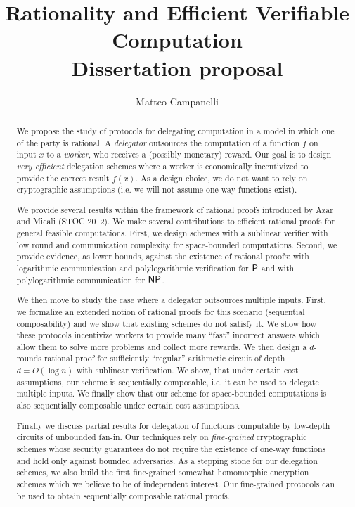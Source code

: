 \documentclass[nobib]{tufte-handout}
\title[Rationality and Efficient Verifiable Computation]{Rationality and Efficient Verifiable Computation\\ \noindent \small{Dissertation proposal}}
\author{Matteo Campanelli}
\date{}
\begin{document}
\maketitle

  
  \begin{abstract}
  	\noindent
  	We propose the study of protocols for delegating computation in a model in which one of the party is rational.
  	A \textit{delegator} outsources the computation of a function $f$ on input $x$ to a \textit{worker}, who
  	receives a (possibly monetary) reward. Our goal is to design \textit{very efficient} delegation schemes 
  	where a worker is economically incentivized to provide the correct result
  	$f(x)$. As a design choice, we do not want to rely on cryptographic assumptions
  	(i.e. we will not assume one-way functions exist).
  	
  	We provide several results within the framework of rational proofs introduced by Azar and Micali (STOC 2012).
  	We make several contributions to efficient rational proofs for general feasible computations.
  	First, we design schemes with a sublinear verifier with low round and communication complexity for
  	space-bounded computations.
  	Second, we provide evidence, as lower bounds, against the existence of rational proofs:
  	with logarithmic communication and polylogarithmic verification for $\P$ and 
  	with polylogarithmic communication for $\NP$.
  	
  	We then move to study the case where a delegator outsources multiple inputs.
  	First, we formalize an extended notion of rational proofs for this scenario (sequential composability) and we
  	show that existing schemes do not satisfy it. We show how these protocols incentivize workers
  	to provide many ``fast'' incorrect answers which allow them to solve more problems and collect more rewards.
  	We then design a $d$-rounds rational proof for sufficiently ``regular'' arithmetic circuit of depth $d = O(\log{n})$
  	with sublinear verification. We show, that under certain cost assumptions, our scheme is sequentially composable,
  	i.e. it can be used to delegate multiple inputs. We finally show that our scheme for space-bounded computations is also 
  	sequentially composable under certain cost assumptions.
  	
  	
	Finally we discuss partial results for delegation of functions computable by low-depth circuits of unbounded fan-in.
	Our techniques rely on \textit{fine-grained} cryptographic schemes whose security guarantees do not require the existence of one-way functions
	and hold only against bounded adversaries. As a stepping stone for our delegation schemes, we also build 
	the first fine-grained somewhat homomorphic encryption schemes which we believe to be of independent interest.
	Our fine-grained protocols can be used to obtain sequentially composable rational proofs.
  \end{abstract}
  
\end{document}
